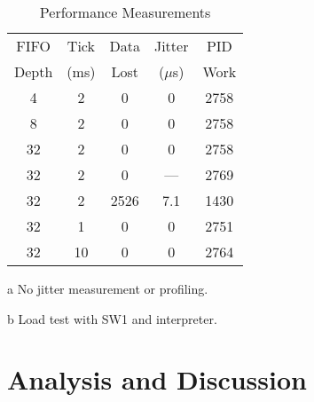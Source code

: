 \documentclass{IEEEtran}
\begin{document}
\begin{table}
\centering
\renewcommand{\arraystretch}{1.1}
\begin{threeparttable}
  \caption{Performance Measurements}
  \label{tbl:perf-tuning}
  \begin{tabular}{cc|ccc}
    FIFO & Tick & Data & Jitter & PID \\
    Depth & (ms) & Lost & ($\mu$s) & Work \\
    \hline
    4 & 2 & 0 & 0 & 2758 \\
    8 & 2 & 0 & 0 & 2758 \\
    \hline
    32 & 2 & 0 & 0 & 2758 \\
    32 & 2 & 0 & ---\tnote{a} & 2769 \\
    32 & 2 & 2526 & 7.1\tnote{b} & 1430 \\
    \hline
    32 & 1 & 0 & 0 & 2751 \\
    32 & 10 & 0 & 0 & 2764 \\
  \end{tabular}
  \begin{tablenotes}
  \item[a] No jitter measurement or profiling.
  \item[b] Load test with SW1 and interpreter.
  \end{tablenotes}
\end{threeparttable}
\end{table}

\section{Analysis and Discussion}
\end{document}
